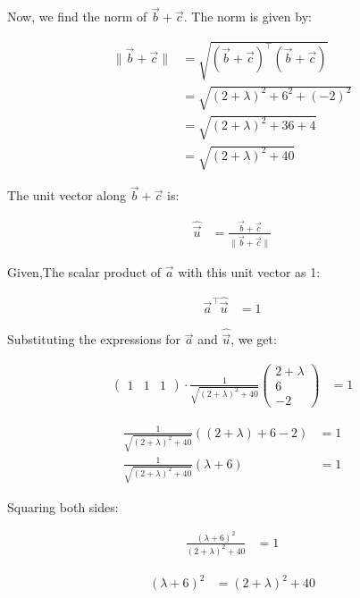 \documentclass[journal]{IEEEtran}
\numberwithin{equation}{enumi}
\numberwithin{figure}{enumi}
\begin{document}
Now, we find the norm of $\vec{b} + \vec{c}$. The norm is given by:

\begin{align}
\|\vec{b} + \vec{c}\| &= \sqrt{(\vec{b} + \vec{c})^\top (\vec{b} + \vec{c})} \\
&= \sqrt{(2 + \lambda)^2 + 6^2 + (-2)^2} \\
&= \sqrt{(2 + \lambda)^2 + 36 + 4} \\
&= \sqrt{(2 + \lambda)^2 + 40}
\end{align}

The unit vector along $\vec{b} + \vec{c}$ is:

\begin{align}
\hat{\vec{u}} &= \frac{\vec{b} + \vec{c}}{\|\vec{b} + \vec{c}\|}
\end{align}

Given,The scalar product of $\vec{a}$ with this unit vector as 1:

\begin{align}
\vec{a}^\top \hat{\vec{u}} &= 1
\end{align}

Substituting the expressions for $\vec{a}$ and $\hat{\vec{u}}$, we get:

\begin{align}
\begin{pmatrix} 1 & 1 & 1 \end{pmatrix} \cdot \frac{1}{\sqrt{(2 + \lambda)^2 + 40}} \begin{pmatrix} 2 + \lambda \\ 6 \\ -2 \end{pmatrix} &= 1
\end{align}



\begin{align}
\frac{1}{\sqrt{(2 + \lambda)^2 + 40}} \left( (2 + \lambda) + 6 - 2 \right) &= 1 \\
\frac{1}{\sqrt{(2 + \lambda)^2 + 40}} ( \lambda + 6) &= 1
\end{align}

Squaring both sides:

\begin{align}
\frac{(\lambda + 6)^2}{(2 + \lambda)^2 + 40} &= 1
\end{align}



\begin{align}
(\lambda + 6)^2 &= (2 + \lambda)^2 + 40
\end{align}
\end{document}
